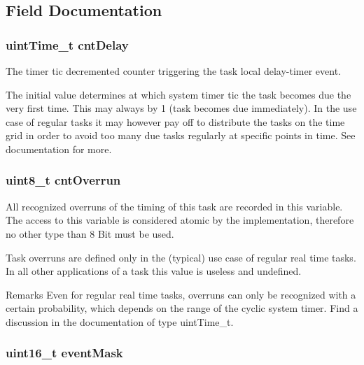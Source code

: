 \subsection{Field Documentation}
\hypertarget{structtask__t_ab3c3ac52ea96b6ed2478df36a9b1906f}{
\subsubsection[{cnt\-Delay}]{\setlength{\rightskip}{0pt plus 5cm}uint\-Time\-\_\-t cnt\-Delay}}\label{structtask__t_ab3c3ac52ea96b6ed2478df36a9b1906f}
The timer tic decremented counter triggering the task local delay-\/timer event.\par
 The initial value determines at which system timer tic the task becomes due the very first time. This may always by 1 (task becomes due immediately). In the use case of regular tasks it may however pay off to distribute the tasks on the time grid in order to avoid too many due tasks regularly at specific points in time. See documentation for more. \hypertarget{structtask__t_ad116bccdc9e4c60355b6200a862db78a}{
\subsubsection[{cnt\-Overrun}]{\setlength{\rightskip}{0pt plus 5cm}uint8\-\_\-t cnt\-Overrun}}\label{structtask__t_ad116bccdc9e4c60355b6200a862db78a}
All recognized overruns of the timing of this task are recorded in this variable. The access to this variable is considered atomic by the implementation, therefore no other type than 8 Bit must be used.\par
 Task overruns are defined only in the (typical) use case of regular real time tasks. In all other applications of a task this value is useless and undefined.\par
 \begin{DoxyRemark}{Remarks}
Even for regular real time tasks, overruns can only be recognized with a certain probability, which depends on the range of the cyclic system timer. Find a discussion in the documentation of type uint\-Time\-\_\-t. 
\end{DoxyRemark}
\hypertarget{structtask__t_ab1e84a1442746b4c7816fd15fff75baf}{
\subsubsection[{event\-Mask}]{\setlength{\rightskip}{0pt plus 5cm}uint16\-\_\-t event\-Mask}}\label{structtask__t_ab1e84a1442746b4c7816fd15fff75baf}
